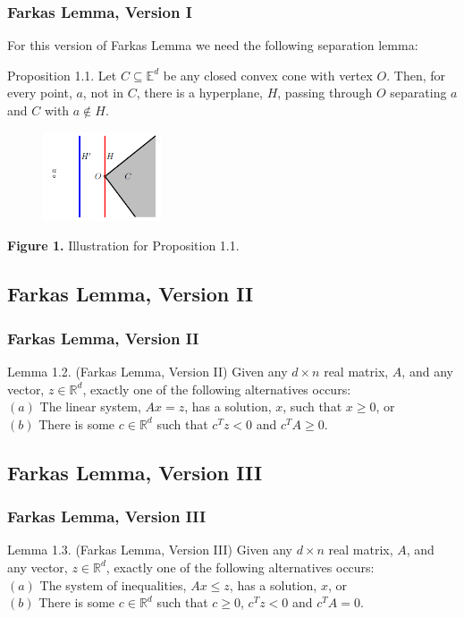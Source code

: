 \documentclass{beamer}
\begin{document}
\begin{frame}\frametitle{Farkas Lemma, Version I}
\begin{block}{}
For this version of Farkas Lemma we need the following separation lemma:
\end{block}
\begin{block}{Proposition 1.1.}
Let $C \subseteq \mathbb{E}^d$ be any closed convex cone with vertex $O$. Then, for every point, $a$, not in $C$, there is a hyperplane, $H$, passing through $O$ separating $a$ and $C$ with $a \notin H.$
\end{block}
\begin{block}{}
\begin{figure}[h]
\includegraphics[width=3.5cm]{picture1}
\end{figure}
\fontsize{6.5pt}{7.2}\selectfont
\centerline{\textbf{Figure 1.} Illustration for Proposition 1.1.}
\end{block}
\end{frame}

\subsection{Farkas Lemma, Version II}
\begin{frame}\frametitle{Farkas Lemma, Version II}
\begin{block}{Lemma 1.2. (Farkas Lemma, Version II)}
Given any $d \times n$ real matrix, $A$, and any vector, $z \in \mathbb{R}^d$, exactly one of the following alternatives occurs: \\
$(a)$ The linear system, $A x = z$, has a solution, $x$, such that $x \geq 0$, or \\
$(b)$ There is some $c \in \mathbb{R}^d$ such that $c^T z < 0$ and $c^T A \geq 0.$
\end{block}
\end{frame}

\subsection{Farkas Lemma, Version III}
\begin{frame}\frametitle{Farkas Lemma, Version III}
\begin{block}{Lemma 1.3. (Farkas Lemma, Version III)}
Given any $d \times n$ real matrix, $A$, and any vector, $z \in \mathbb{R}^d$, exactly one of the following alternatives occurs: \\
$(a)$ The system of inequalities, $A x \leq z$, has a solution, $x$, or \\
$(b)$ There is some $c \in \mathbb{R}^d$ such that $c \geq 0$, $c^T z < 0$ and $c^T A = 0$.
\end{block}
\end{frame}
\end{document}

